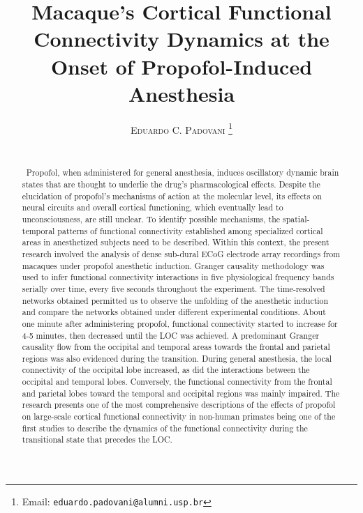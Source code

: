 \documentclass[twoside]{article}
\title{\vspace{-15mm}\fontsize{25pt}{10pt}\selectfont\textbf{Macaque's Cortical Functional Connectivity Dynamics at the Onset of Propofol-Induced Anesthesia}} %
\author{
\large
\textsc{Eduardo C. Padovani}
\thanks{Email: \texttt{eduardo.padovani@alumni.usp.br}}\\[2mm] %
\normalsize \\ %
\normalsize 
\vspace{-5mm}
}
\date{}
\begin{document}
\maketitle %

\thispagestyle{fancy} %



\begin{abstract}



\noindent \ Propofol, when administered for general anesthesia, induces oscillatory dynamic brain states that are thought to underlie the drug’s pharmacological effects. Despite the elucidation of propofol’s mechanisms of action at the molecular level, its effects on neural circuits and overall cortical functioning, which eventually lead to unconsciousness, are still unclear. To identify possible mechanisms, the spatial-temporal patterns of functional connectivity established among specialized cortical areas in anesthetized subjects need to be described. Within this context, the present research involved the analysis of dense sub-dural ECoG electrode array recordings from macaques under propofol anesthetic induction. Granger causality methodology was used to infer functional connectivity interactions in five physiological frequency bands serially over time, every five seconds throughout the experiment. The time-resolved networks obtained permitted us to observe the unfolding of the anesthetic induction and compare the networks obtained under different experimental conditions. About one minute after administering propofol, functional connectivity started to increase for 4-5 minutes, then decreased until the LOC was achieved. A predominant Granger causality flow from the occipital and temporal areas towards the frontal and parietal regions was also evidenced during the transition. During general anesthesia, the local connectivity of the occipital lobe increased, as did the interactions between the occipital and temporal lobes. Conversely, the functional connectivity from the frontal and parietal lobes toward the temporal and occipital regions was mainly impaired. The research presents one of the most comprehensive descriptions of the effects of propofol on large-scale cortical functional connectivity in non-human primates being one of the first studies to describe the dynamics of the functional connectivity during the transitional state that precedes the LOC.
%
\end{abstract}
\end{document}

